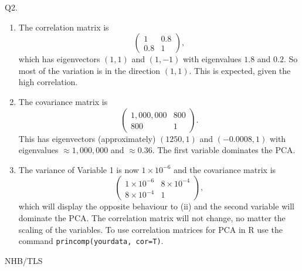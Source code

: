 \documentclass[12pt]{article}
\begin{document}
\ni Q2. \begin{enumerate}
\item The correlation matrix is
$$\left(
\begin{array}{cc}
1 & 0.8 \\
0.8 & 1 
\end{array}
\right),$$
which has eigenvectors $(1,1)$ and $(1,-1)$ with eigenvalues $1.8$ and $0.2$. So most of the variation is in the direction $(1,1)$. This is expected, given the high correlation. 
\item The covariance matrix is
$$\left(
\begin{array}{cc}
1,000,000 & 800 \\
800 & 1 
\end{array}
\right).$$
This has eigenvectors (approximately) $(1250, 1)$ and $(-0.0008,1)$ with eigenvalues $\approx 1,000,000$ and $\approx 0.36$. The first variable dominates the PCA. 
\item The variance of Variable 1 is now $1 \times 10^{-6}$ and the covariance matrix is
$$\left(
\begin{array}{cc}
1 \times 10^{-6} & 8 \times 10^{-4} \\
8 \times 10^{-4} & 1 
\end{array}
\right),$$
which will display the opposite behaviour to (ii) and the second variable will dominate the PCA. The correlation matrix will not change, no matter the scaling of the variables. To use correlation matrices for PCA in R use the command \texttt{princomp(yourdata, cor=T)}.\end{enumerate} 


\hfil NHB/TLS \break
\end{document}
